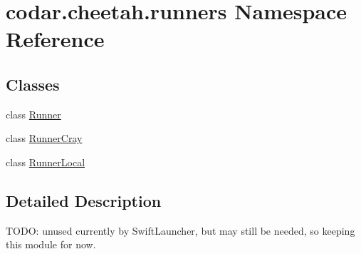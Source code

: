 \hypertarget{namespacecodar_1_1cheetah_1_1runners}{}\section{codar.\+cheetah.\+runners Namespace Reference}
\label{namespacecodar_1_1cheetah_1_1runners}
\subsection*{Classes}
\begin{DoxyCompactItemize}
\item 
class \hyperlink{classcodar_1_1cheetah_1_1runners_1_1_runner}{Runner}
\item 
class \hyperlink{classcodar_1_1cheetah_1_1runners_1_1_runner_cray}{Runner\+Cray}
\item 
class \hyperlink{classcodar_1_1cheetah_1_1runners_1_1_runner_local}{Runner\+Local}
\end{DoxyCompactItemize}


\subsection{Detailed Description}
\begin{DoxyVerb}TODO: unused currently by SwiftLauncher, but may still be needed, so keeping
this module for now.
\end{DoxyVerb}
 
